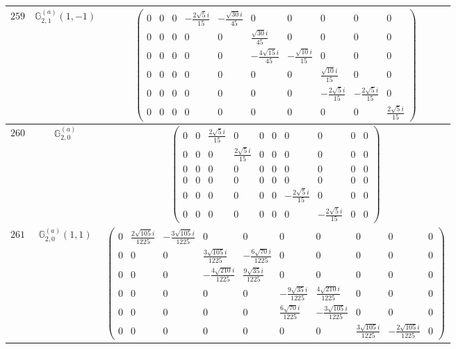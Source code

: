 \documentclass[fleqn,8pt,landscape]{jsarticle}
\begin{document}
\begin{center}
\begin{longtable}{ccc}
$ 259 $ & $ \mathbb{G}_{2,1}^{(a)}(1,-1) $ & $ \begin{pmatrix} 0 & 0 & 0 & - \frac{2 \sqrt{5} i}{15} & - \frac{\sqrt{30} i}{45} & 0 & 0 & 0 & 0 & 0 \\ 0 & 0 & 0 & 0 & 0 & \frac{\sqrt{30} i}{45} & 0 & 0 & 0 & 0 \\ 0 & 0 & 0 & 0 & 0 & - \frac{4 \sqrt{15} i}{45} & - \frac{\sqrt{10} i}{15} & 0 & 0 & 0 \\ 0 & 0 & 0 & 0 & 0 & 0 & 0 & \frac{\sqrt{10} i}{15} & 0 & 0 \\ 0 & 0 & 0 & 0 & 0 & 0 & 0 & - \frac{2 \sqrt{5} i}{15} & - \frac{2 \sqrt{5} i}{15} & 0 \\ 0 & 0 & 0 & 0 & 0 & 0 & 0 & 0 & 0 & \frac{2 \sqrt{5} i}{15} \end{pmatrix} $ \\ \hline
$ 260 $ & $ \mathbb{G}_{2,0}^{(a)} $ & $ \begin{pmatrix} 0 & 0 & \frac{2 \sqrt{5} i}{15} & 0 & 0 & 0 & 0 & 0 & 0 & 0 \\ 0 & 0 & 0 & \frac{2 \sqrt{5} i}{15} & 0 & 0 & 0 & 0 & 0 & 0 \\ 0 & 0 & 0 & 0 & 0 & 0 & 0 & 0 & 0 & 0 \\ 0 & 0 & 0 & 0 & 0 & 0 & 0 & 0 & 0 & 0 \\ 0 & 0 & 0 & 0 & 0 & 0 & - \frac{2 \sqrt{5} i}{15} & 0 & 0 & 0 \\ 0 & 0 & 0 & 0 & 0 & 0 & 0 & - \frac{2 \sqrt{5} i}{15} & 0 & 0 \end{pmatrix} $ \\ \hline
$ 261 $ & $ \mathbb{G}_{2,0}^{(a)}(1,1) $ & $ \begin{pmatrix} 0 & \frac{2 \sqrt{105} i}{1225} & - \frac{3 \sqrt{105} i}{1225} & 0 & 0 & 0 & 0 & 0 & 0 & 0 \\ 0 & 0 & 0 & \frac{3 \sqrt{105} i}{1225} & - \frac{6 \sqrt{70} i}{1225} & 0 & 0 & 0 & 0 & 0 \\ 0 & 0 & 0 & - \frac{4 \sqrt{210} i}{1225} & \frac{9 \sqrt{35} i}{1225} & 0 & 0 & 0 & 0 & 0 \\ 0 & 0 & 0 & 0 & 0 & - \frac{9 \sqrt{35} i}{1225} & \frac{4 \sqrt{210} i}{1225} & 0 & 0 & 0 \\ 0 & 0 & 0 & 0 & 0 & \frac{6 \sqrt{70} i}{1225} & - \frac{3 \sqrt{105} i}{1225} & 0 & 0 & 0 \\ 0 & 0 & 0 & 0 & 0 & 0 & 0 & \frac{3 \sqrt{105} i}{1225} & - \frac{2 \sqrt{105} i}{1225} & 0 \end{pmatrix} $ \\ \hline

\end{longtable}
\end{center}
\end{document}
